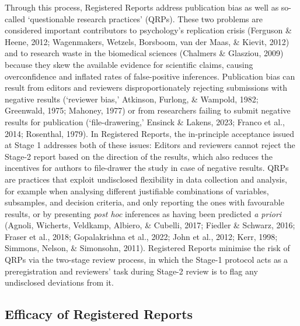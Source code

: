 \documentclass[
  british,
  a4paper,
  ,man,mask,floatsintext]{apa6}
\begin{document}
Through this process, Registered Reports address publication bias as well as so-called `questionable research practices' (QRPs).
These two problems are considered important contributors to psychology's replication crisis (Ferguson \& Heene, 2012; Wagenmakers, Wetzels, Borsboom, van der Maas, \& Kievit, 2012) and to research waste in the biomedical sciences (Chalmers \& Glasziou, 2009) because they skew the available evidence for scientific claims, causing overconfidence and inflated rates of false-positive inferences.
Publication bias can result from editors and reviewers disproportionately rejecting submissions with negative results (`reviewer bias,' Atkinson, Furlong, \& Wampold, 1982; Greenwald, 1975; Mahoney, 1977) or from researchers failing to submit negative results for publication (`file-drawering,' Ensinck \& Lakens, 2023; Franco et al., 2014; Rosenthal, 1979).
In Registered Reports, the
in-principle acceptance issued at Stage 1 addresses both of these issues:
Editors and reviewers cannot reject the Stage-2 report based on the direction of the results, which also reduces the incentives for authors to file-drawer the study in case of negative results.
QRPs are practices that exploit undisclosed flexibility in data collection and analysis, for example when analysing different justifiable combinations of variables, subsamples, and decision criteria, and only reporting the ones with favourable results, or by presenting \emph{post hoc} inferences as having been predicted \emph{a priori} (Agnoli, Wicherts, Veldkamp, Albiero, \& Cubelli, 2017; Fiedler \& Schwarz, 2016; Fraser et al., 2018; Gopalakrishna et al., 2022; John et al., 2012; Kerr, 1998; Simmons, Nelson, \& Simonsohn, 2011).
Registered Reports minimise the risk of QRPs via the two-stage review process, in which the Stage-1 protocol acts as a preregistration and reviewers' task during Stage-2 review is to flag any undisclosed deviations from it.

\subsection{Efficacy of Registered Reports}\label{efficacy-of-registered-reports}
\end{document}
